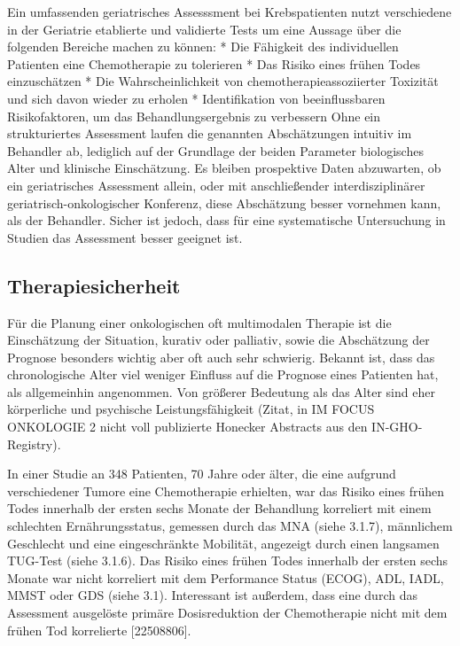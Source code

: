 Ein umfassenden geriatrisches Assesssment bei Krebspatienten nutzt verschiedene in der Geriatrie etablierte und validierte Tests um eine Aussage über die folgenden Bereiche machen zu können:
* Die Fähigkeit des individuellen Patienten eine Chemotherapie zu tolerieren
* Das Risiko eines frühen Todes einzuschätzen
* Die Wahrscheinlichkeit von chemotherapieassoziierter Toxizität und sich davon wieder zu erholen
* Identifikation von beeinflussbaren Risikofaktoren, um das Behandlungsergebnis zu verbessern
Ohne ein strukturiertes Assessment laufen die genannten Abschätzungen intuitiv im Behandler ab, lediglich auf der Grundlage der beiden Parameter biologisches Alter und klinische Einschätzung.
Es bleiben prospektive Daten abzuwarten, ob ein geriatrisches Assessment allein, oder mit anschließender interdisziplinärer geriatrisch-onkologischer Konferenz, diese Abschätzung besser vornehmen kann, als der Behandler. Sicher ist jedoch, dass für eine systematische Untersuchung in Studien das Assessment besser geeignet ist.

\subsection{Therapiesicherheit}

Für die Planung einer onkologischen oft multimodalen Therapie ist die Einschätzung der Situation, kurativ oder palliativ, sowie die Abschätzung der Prognose besonders wichtig aber oft auch sehr schwierig. Bekannt ist, dass das chronologische Alter viel weniger Einfluss auf die Prognose eines Patienten hat, als allgemeinhin angenommen. Von größerer Bedeutung als das Alter sind eher körperliche und psychische Leistungsfähigkeit (Zitat, in IM FOCUS ONKOLOGIE 2 nicht voll publizierte Honecker Abstracts aus den IN-GHO-Registry).

In einer Studie an 348 Patienten, 70 Jahre oder älter, die eine aufgrund verschiedener Tumore eine Chemotherapie erhielten, war das Risiko eines frühen Todes innerhalb der ersten sechs Monate der Behandlung korreliert mit einem schlechten Ernährungsstatus, gemessen durch das MNA (siehe 3.1.7), männlichem Geschlecht und eine eingeschränkte Mobilität, angezeigt durch einen langsamen TUG-Test (siehe 3.1.6). Das Risiko eines frühen Todes innerhalb der ersten sechs Monate war nicht korreliert mit dem Performance Status (ECOG), ADL, IADL, MMST oder GDS (siehe 3.1). Interessant ist außerdem, dass eine durch das Assessment ausgelöste primäre Dosisreduktion der Chemotherapie nicht mit dem frühen Tod korrelierte [22508806].

